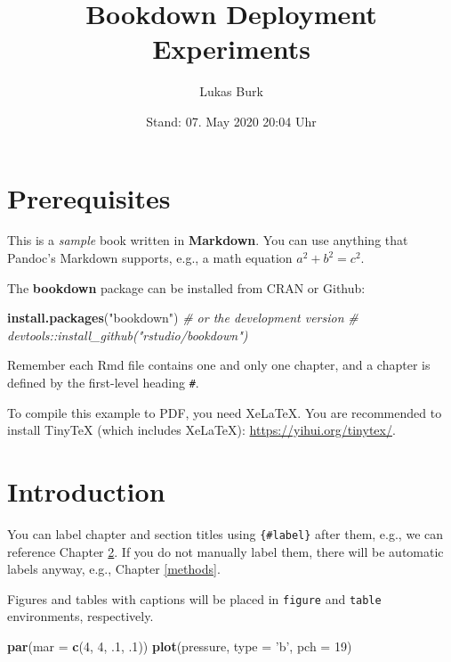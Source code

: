 \documentclass[ngerman,a4paper,]{scrartcl}
\title{Bookdown Deployment Experiments}
\author{Lukas Burk}
\date{Stand: 07. May 2020 20:04 Uhr}
\newenvironment{Shaded}{\begin{snugshade}}{\end{snugshade}}
\newcommand{\CommentTok}[1]{\textcolor[rgb]{0.56,0.35,0.01}{\textit{#1}}}
\newcommand{\DataTypeTok}[1]{\textcolor[rgb]{0.13,0.29,0.53}{#1}}
\newcommand{\DecValTok}[1]{\textcolor[rgb]{0.00,0.00,0.81}{#1}}
\newcommand{\FloatTok}[1]{\textcolor[rgb]{0.00,0.00,0.81}{#1}}
\newcommand{\KeywordTok}[1]{\textcolor[rgb]{0.13,0.29,0.53}{\textbf{#1}}}
\newcommand{\NormalTok}[1]{#1}
\newcommand{\StringTok}[1]{\textcolor[rgb]{0.31,0.60,0.02}{#1}}
\begin{document}
\maketitle

{
\hypersetup{linkcolor=}
\setcounter{tocdepth}{2}
\tableofcontents
}
\hypertarget{prerequisites}{%
\section{Prerequisites}\label{prerequisites}}

This is a \emph{sample} book written in \textbf{Markdown}. You can use anything that Pandoc's Markdown supports, e.g., a math equation \(a^2 + b^2 = c^2\).

The \textbf{bookdown} package can be installed from CRAN or Github:

\begin{Shaded}
\begin{Highlighting}[]
\KeywordTok{install.packages}\NormalTok{(}\StringTok{"bookdown"}\NormalTok{)}
\CommentTok{# or the development version}
\CommentTok{# devtools::install_github("rstudio/bookdown")}
\end{Highlighting}
\end{Shaded}

Remember each Rmd file contains one and only one chapter, and a chapter is defined by the first-level heading \texttt{\#}.

To compile this example to PDF, you need XeLaTeX. You are recommended to install TinyTeX (which includes XeLaTeX): \url{https://yihui.org/tinytex/}.

\hypertarget{intro}{%
\section{Introduction}\label{intro}}

You can label chapter and section titles using \texttt{\{\#label\}} after them, e.g., we can reference Chapter \ref{intro}. If you do not manually label them, there will be automatic labels anyway, e.g., Chapter \ref{methods}.

Figures and tables with captions will be placed in \texttt{figure} and \texttt{table} environments, respectively.

\begin{Shaded}
\begin{Highlighting}[]
\KeywordTok{par}\NormalTok{(}\DataTypeTok{mar =} \KeywordTok{c}\NormalTok{(}\DecValTok{4}\NormalTok{, }\DecValTok{4}\NormalTok{, }\FloatTok{.1}\NormalTok{, }\FloatTok{.1}\NormalTok{))}
\KeywordTok{plot}\NormalTok{(pressure, }\DataTypeTok{type =} \StringTok{'b'}\NormalTok{, }\DataTypeTok{pch =} \DecValTok{19}\NormalTok{)}
\end{Highlighting}
\end{Shaded}
\end{document}
